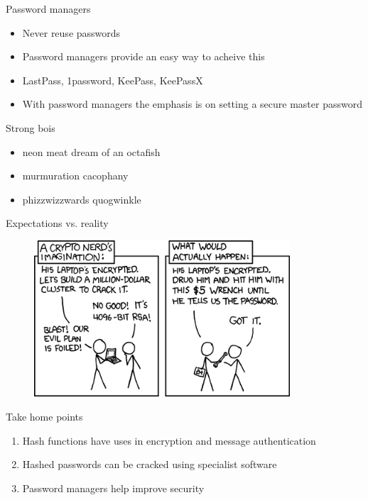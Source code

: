 \documentclass[12pt,aspectratio=169]{beamer}
\begin{document}
\begin{frame}{Password managers}
    \begin{itemize}
        \item Never reuse passwords
        \item Password managers provide an easy way to acheive this
        \item LastPass, 1password, KeePass, KeePassX
        \item With password managers the emphasis is on setting a secure master password
    \end{itemize}
\end{frame}

\begin{frame}{Strong bois}
    \begin{itemize}
        \item neon meat dream of an octafish
        \item murmuration cacophany
        \item phizzwizzwards quogwinkle
    \end{itemize}
\end{frame}

\begin{frame}{Expectations vs. reality}
    \begin{figure}
        \includegraphics[width=0.85\textwidth]{security.png}
    \end{figure}
\end{frame}

\begin{frame}{Take home points}
    \begin{enumerate}
        \item Hash functions have uses in encryption and message authentication
        \item Hashed passwords can be cracked using specialist software
        \item Password managers help improve security
    \end{enumerate}
\end{frame}
\end{document}
